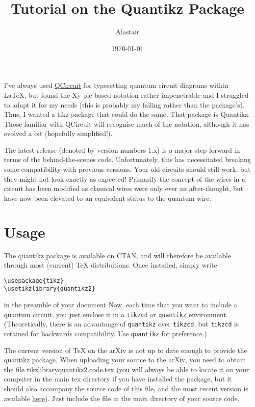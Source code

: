 \documentclass[aps,pra,10pt,nofootinbib]{revtex4-2}
\begin{document}
\title{Tutorial on the Quantikz Package}
\date{\today}
\author{Alastair }
\begin{abstract}
\end{abstract}
\maketitle
I've always used \href{https://arxiv.org/abs/quant-ph/0406003}{QCircuit} for typesetting quantum circuit diagrams within \LaTeX, but found the Xy-pic based notation rather impenetrable and I struggled to adapt it for my needs (this is probably my failing rather than the package's). Thus, I wanted a tikz package that could do the same. That package is Quantikz. Those familiar with QCircuit will recognise much of the notation, although it has evolved a bit (hopefully simplified!).

The latest release (denoted by version numbers 1.x) is a major step forward in terms of the behind-the-scenes code. Unfortunately, this has necessitated breaking some compatibility with previous versions. Your old circuits should still work, but they might not look exactly as expected! Primarily the concept of the wires in a circuit has been modified as classical wires were only ever an after-thought, but have now been elevated to an equivalent status to the quantum wire.

\tableofcontents

\section{Usage}

The quantikz package is available on CTAN, and will therefore be available through most (current) TeX distributions. Once installed, simply write
\begin{verbatim}
\usepackage{tikz}
\usetikzlibrary{quantikz2}
\end{verbatim}
in the preamble of your document
Now, each time that you want to include a quantum circuit, you just enclose it in a \verb!tikzcd! or \verb!quantikz! environment. (Theoretically, there is an advantange of \verb!quantikz! over \verb!tikzcd!, but \verb!tikzcd! is retained for backwards compatibility. Use \verb!quantikz! for preference.)

The current version of TeX on the arXiv is not up to date enough to provide the quantikz package. When uploading your source to the arXiv, you need to obtain the file tikzlibraryquantikz2.code.tex (you will always be able to locate it on your computer in the main tex directory if you have installed the package, but it should also accompany the source code of this file, and the most recent version is available \href{https://ctan.org/tex-archive/graphics/pgf/contrib/quantikz}{here}). Just include the file in the main directory of your source code.
\end{document}
